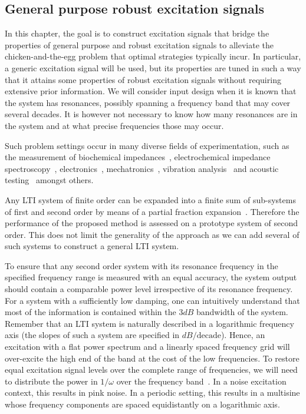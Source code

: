 \subsection{General purpose robust excitation signals}
\label{sec:excitation:intro:approach}
In this chapter, the goal is to construct excitation signals that bridge the properties of general purpose and robust excitation signals to alleviate the chicken-and-the-egg problem that optimal strategies typically incur.
In particular, a generic excitation signal will be used, but its properties are tuned in such a way that it attains some properties of robust excitation signals without requiring extensive prior information.
We will consider input design when it is known that the system has resonances, possibly spanning a frequency band that may cover several decades. 
It is however not necessary to know how many resonances are in the system and at what precise frequencies those may occur.

Such problem settings occur in many diverse fields of experimentation, such as the measurement of biochemical impedances~\citep{Bragos2001,Sanchez2011}, electrochemical impedance spectroscopy~\citep{Niedostatkiewicz2009,VanGheem2004,Breugelmans2010}, electronics~\citep{Munir2011}, mechatronics~\citep{Steinbuch1998,Oomen2016}, vibration analysis~\citep{Karnopp1995,Voorhoeve2015SYSID} and acoustic testing~\citep{GarciaLopez2014,DAmico2014} amongst others. 

  Any \gls{LTI} system of finite order can be expanded into a finite sum of sub-systems of first and second order by means of a partial fraction expansion~\citep{Oppenheim1983}.
  Therefore the performance of the proposed method is assessed on a prototype system of second order.
  This does not limit the generality of the approach as we can add several of such systems to construct a general \gls{LTI} system.
  
  To ensure that any second order system with its resonance frequency in the specified frequency range is measured with an equal accuracy, the system output should contain a comparable power level irrespective of its resonance frequency.
  For a system with a sufficiently low damping, one can intuitively understand that most of the information is contained within the $3 \unit{dB}$ bandwidth of the system.
  Remember that an \gls{LTI} system is naturally described in a logarithmic frequency axis (the slopes of such a system are specified in $\unit{dB}/\text{decade}$).
  Hence, an excitation with a flat power spectrum and a linearly spaced frequency grid will over-excite the high end of the band at the cost of the low frequencies.
  To restore equal excitation signal levels over the complete range of frequencies, we will need to distribute the power in $1/\omega$ over the frequency band~\citep{Goodwin2006,Goodwin2006GBO}.
  In a noise excitation context, this results in pink noise.
  In a periodic setting, this results in a multisine whose frequency components are spaced equidistantly on a logarithmic axis.
  
